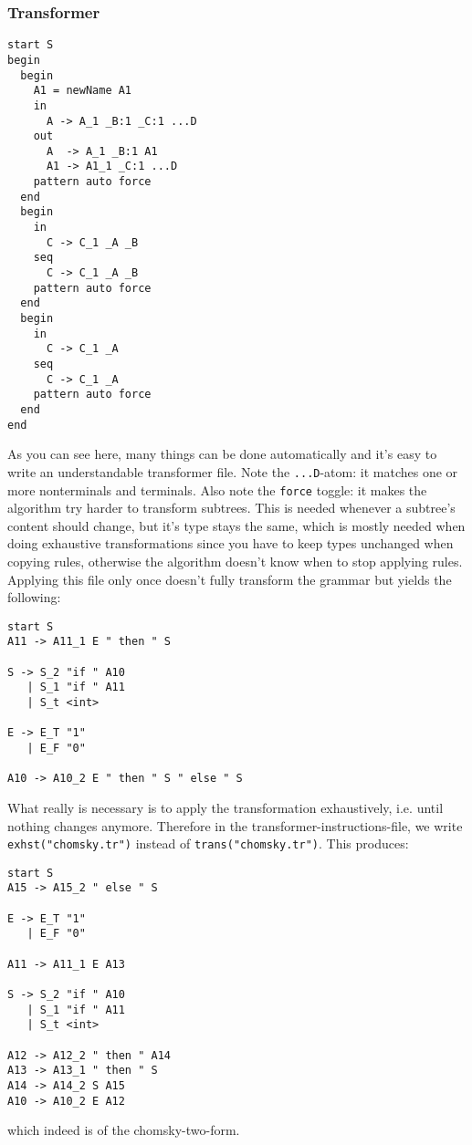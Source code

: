 \documentclass[a4paper]{article}
\begin{document}
\subsubsection{Transformer}
\begin{lstlisting}[language=transformer]
start S
begin
  begin
    A1 = newName A1
    in
      A -> A_1 _B:1 _C:1 ...D 
    out 
      A  -> A_1 _B:1 A1  
      A1 -> A1_1 _C:1 ...D
    pattern auto force
  end
  begin
    in
      C -> C_1 _A _B
    seq
      C -> C_1 _A _B
    pattern auto force
  end
  begin
    in
      C -> C_1 _A
    seq
      C -> C_1 _A
    pattern auto force
  end
end
\end{lstlisting}
As you can see here, many things can be done automatically and it's easy to write an understandable transformer file. Note the \verb|...D|-atom: it matches one or more nonterminals and terminals. Also note the \verb|force| toggle: it makes the algorithm try harder to transform subtrees. This is needed whenever a subtree's content should change, but it's type stays the same, which is mostly needed when doing exhaustive transformations since you have to keep types unchanged when copying rules, otherwise the algorithm doesn't know when to stop applying rules.\\
Applying this file only once doesn't fully transform the grammar but yields the following:
\begin{lstlisting}[language=grammar]
start S
A11 -> A11_1 E " then " S

S -> S_2 "if " A10
   | S_1 "if " A11
   | S_t <int>

E -> E_T "1"
   | E_F "0"

A10 -> A10_2 E " then " S " else " S
\end{lstlisting}
What really is necessary is to apply the transformation exhaustively, i.e. until nothing changes anymore. Therefore in the transformer-instructions-file, we write \verb|exhst("chomsky.tr")| instead of \verb|trans("chomsky.tr")|. This produces:
\begin{lstlisting}[language=grammar]
start S
A15 -> A15_2 " else " S

E -> E_T "1"
   | E_F "0"

A11 -> A11_1 E A13

S -> S_2 "if " A10
   | S_1 "if " A11
   | S_t <int>

A12 -> A12_2 " then " A14
A13 -> A13_1 " then " S
A14 -> A14_2 S A15
A10 -> A10_2 E A12
\end{lstlisting}
which indeed is of the chomsky-two-form.
\end{document}
